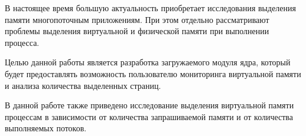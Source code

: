 \Introduction

В настоящее время большую актуальность 
приобретает исследования выделения памяти многопоточным приложениям.
При этом отдельно рассматривают проблемы выделения 
виртуальной и физической памяти при выполнении процесса.




Целью данной работы является разработка загружаемого модуля ядра,
который будет предоставлять возможность пользователю мониторинга
виртуальной памяти и анализа количества выделенных страниц.

В данной работе также приведено исследование выделения виртуальной памяти процессам 
в зависимости от количества запрашиваемой памяти и от количества выполняемых потоков.



